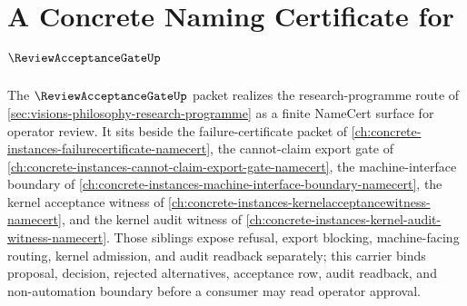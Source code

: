 \chapter{A Concrete Naming Certificate for $\ReviewAcceptanceGateUp$}
\label{ch:concrete-instances-review-acceptance-gate-namecert}

The $\ReviewAcceptanceGateUp$ packet realizes the research-programme route of \autoref{sec:visions-philosophy-research-programme} as a finite NameCert surface for operator review. It sits beside the failure-certificate packet of \autoref{ch:concrete-instances-failurecertificate-namecert}, the cannot-claim export gate of \autoref{ch:concrete-instances-cannot-claim-export-gate-namecert}, the machine-interface boundary of \autoref{ch:concrete-instances-machine-interface-boundary-namecert}, the kernel acceptance witness of \autoref{ch:concrete-instances-kernelacceptancewitness-namecert}, and the kernel audit witness of \autoref{ch:concrete-instances-kernel-audit-witness-namecert}. Those siblings expose refusal, export blocking, machine-facing routing, kernel admission, and audit readback separately; this carrier binds proposal, decision, rejected alternatives, acceptance row, audit readback, and non-automation boundary before a consumer may read operator approval.

